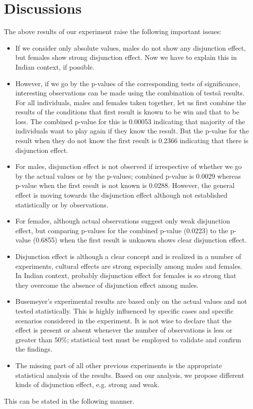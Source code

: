 \documentclass[review]{elsarticle}
\begin{document}
\noindent
\vskip5pt

\section{Discussions}
The above results of our experiment raise the following important issues:

\begin{itemize}
\item 	If we consider only absolute values, males do not show any disjunction effect, but females show strong disjunction effect. Now we have to explain this in Indian context, if possible.
\item	However, if we go by the p-values of the corresponding tests of significance, interesting observations can be made using the combination of testsâ results. For all individuals, males and females taken together, let us first combine the results of the conditions that first result is known to be win and that to be loss. The combined p-value for this is 0.00053 indicating that majority of the individuals want to play again if they know the result. But the p-value for the result when they do not know the first result is 0.2366 indicating that there is disjunction effect.
\item For males, disjunction effect is not observed if irrespective of whether we go by the actual values or by the p-values; combined p-value is 0.0029 whereas p-value when the first result is not known is 0.0288. However, the general effect is moving towards the disjunction effect although not established statistically or by observations.
\item For females, although actual observations suggest only weak disjunction effect, but comparing p-values for the combined p-value (0.0223) to the p-value (0.6855) when the first result is unknown shows clear disjunction effect.
\item Disjunction effect is although a clear concept and is realized in a number of experiments, cultural effects are strong especially among males and females. In Indian context, probably disjunction effect for females is so strong that they overcome the absence of disjunction effect among males.
\item Busemeyer's experimental results are based only on the actual values and not tested statistically. This is highly influenced by specific cases and specific scenarios considered in the experiment. It is not wise to declare that the effect is present or absent whenever the number of observations is less or greater than $50\%$; statistical test must be employed to validate and confirm the findings.
\item The missing part of all other previous experiments is the appropriate statistical analysis of the results. Based on our analysis, we propose different kinds of disjunction effect, e.g. strong and weak. 
\end{itemize}
This can be stated in the following manner.
\end{document}
